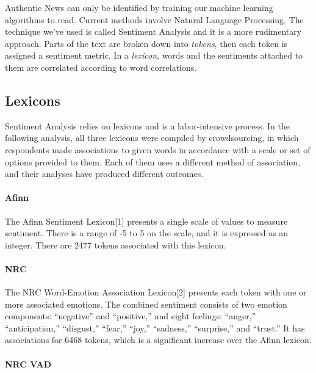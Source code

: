 \documentclass[
]{article}
\begin{document}
Authentic News can only be identified by training our machine learning
algorithms to read. Current methods involve Natural Language Processing.
The technique we've used is called Sentiment Analysis and it is a more
rudimentary approach. Parts of the text are broken down into
\emph{tokens}, then each token is assigned a sentiment metric. In a
\emph{lexicon}, words and the sentiments attached to them are correlated
according to word correlations.

\hypertarget{lexicons}{%
\subsection{Lexicons}\label{lexicons}}

Sentiment Analysis relies on lexicons and is a labor-intensive process.
In the following analysis, all three lexicons were compiled by
crowdsourcing, in which respondents made associations to given words in
accordance with a scale or set of options provided to them. Each of them
uses a different method of association, and their analyses have produced
different outcomes.

\hypertarget{afinn}{%
\paragraph{Afinn}\label{afinn}}

The Afinn Sentiment Lexicon{[}1{]} presents a single scale of values to
measure sentiment. There is a range of -5 to 5 on the scale, and it is
expressed as an integer. There are 2477 tokens associated with this
lexicon.

\hypertarget{nrc}{%
\paragraph{NRC}\label{nrc}}

The NRC Word-Emotion Association Lexicon{[}2{]} presents each token with
one or more associated emotions. The combined sentiment consists of two
emotion components: ``negative'' and ``positive,'' and eight feelings:
``anger,'' ``anticipation,'' ``disgust,'' ``fear,'' ``joy,''
``sadness,'' ``surprise,'' and ``trust.'' It has associations for 6468
tokens, which is a significant increase over the Afinn lexicon.

\hypertarget{nrc-vad}{%
\paragraph{NRC VAD}\label{nrc-vad}}
\end{document}
